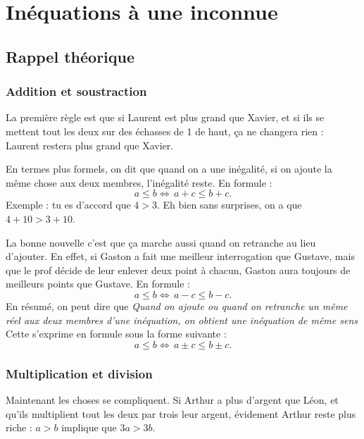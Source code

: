 

%
   \section{Inéquations à une inconnue}
%

\subsection{Rappel théorique}

\subsubsection{Addition et soustraction}


La première règle est que si Laurent est plus grand que Xavier, et si ils se mettent tout les deux sur des échasses de \unit{1}{\meter} de haut, ça ne changera rien : Laurent restera plus grand que Xavier. 

En termes plus formels, on dit que quand on a une inégalité, si on ajoute la même chose aux deux membres, l'inégalité reste. En formule :
\[ 
  a\leq b\Longleftrightarrow\, a+c\leq b+ c.
\]
Exemple : tu es d'accord que $4 > 3$. Eh bien sans surprises, on a que $4+10 > 3+10$.

La bonne nouvelle c'est que ça marche aussi quand on retranche au lieu d'ajouter. En effet, si Gaston a fait une meilleur interrogation que Gustave, mais que le prof décide de leur enlever deux point à chacun, Gaston aura toujours de meilleurs points que Gustave. En formule :
\[ 
  a\leq b\Longleftrightarrow\, a-c\leq b- c.
\]
En résumé, on peut dire que
\emph{Quand on ajoute ou quand on retranche un même réel aux deux membres d'une inéquation, on obtient une inéquation de même sens}
Cette s'exprime en formule sous la forme suivante :
\[ 
  a\leq b\Longleftrightarrow\, a\pm c\leq b\pm c.
\]

\subsubsection{Multiplication et division}

Maintenant les choses se compliquent. Si Arthur a plus d'argent que Léon, et qu'ils multiplient tout les deux par trois leur argent, évidement Arthur reste plus riche : $a > b$ implique que $3a>3b$.


